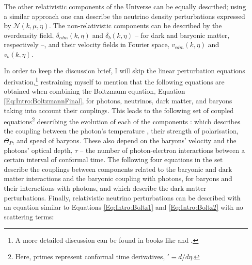 \qquad The other relativistic components of the Universe can be equally described; using a similar approach one can describe the neutrino density perturbations expressed by $\mathcal{N}(k,\mu,\eta)$. The non-relativistic components can be described by the overdensity field, $\delta_{cdm}(k,\eta)$ and $\delta_b(k,\eta)$ -- for dark and baryonic matter, respectively --, and their velocity fields in Fourier space, $v_{cdm}(k,\eta)$ and $v_{b}(k,\eta)$.  

\qquad In order to keep the discussion brief, I will skip the linear perturbation equations derivation,\footnote{A more detailed discussion can be found in books like \cite{padmanabhan_1999,Peacock} and \cite{dods}.} restraining myself to mention that the following equations are obtained when combining the Boltzmann equation, Equation \eqref{Eq:Intro:BoltzmannFinal}, for photons, neutrinos, dark matter, and baryons taking into account their couplings. This leads to the following set of coupled equations\footnote{Here, primes represent conformal time derivatives, $' \equiv d/d\eta$.} describing the evolution of each of the components \citep{dods}:
which describes the coupling between the photon's temperature , their strength of polarisation, $\Theta_P$, and speed of baryons. These also depend on the baryons' velocity and the photons' optical depth, $\tau$ -- the number of photon-electron interactions between a certain interval of conformal time. The following four equations in the set describe the couplings between components related to the baryonic and dark matter interactions and the baryonic coupling with photons, 
for baryons and their interactions with photons, and
which describe the dark matter perturbations. Finally, relativistic neutrino perturbations can be described with an equation similar to Equations \eqref{Eq:Intro:Boltz1} and \eqref{Eq:Intro:Boltz2} with no scattering terms:

